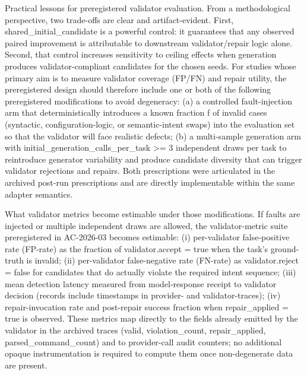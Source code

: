 \documentclass[conference]{IEEEtran}
\begin{document}
Practical lessons for preregistered validator evaluation. From a methodological perspective, two trade-offs are clear and artifact-evident. First, shared\_initial\_candidate is a powerful control: it guarantees that any observed paired improvement is attributable to downstream validator/repair logic alone. Second, that control increases sensitivity to ceiling effects when generation produces validator-compliant candidates for the chosen seeds. For studies whose primary aim is to measure validator coverage (FP/FN) and repair utility, the preregistered design should therefore include one or both of the following preregistered modifications to avoid degeneracy: (a) a controlled fault-injection arm that deterministically introduces a known fraction f of invalid cases (syntactic, configuration-logic, or semantic-intent swaps) into the evaluation set so that the validator will face realistic defects; (b) a multi-sample generation arm with initial\_generation\_calls\_per\_task >= 3 independent draws per task to reintroduce generator variability and produce candidate diversity that can trigger validator rejections and repairs. Both prescriptions were articulated in the archived post-run prescriptions and are directly implementable within the same adapter semantics.

What validator metrics become estimable under those modifications. If faults are injected or multiple independent draws are allowed, the validator-metric suite preregistered in AC-2026-03 becomes estimable: (i) per-validator false-positive rate (FP-rate) as the fraction of validator.accept = true when the task's ground-truth is invalid; (ii) per-validator false-negative rate (FN-rate) as validator.reject = false for candidates that do actually violate the required intent sequence; (iii) mean detection latency measured from model-response receipt to validator decision (records include timestamps in provider- and validator-traces); (iv) repair-invocation rate and post-repair success fraction when repair\_applied = true is observed. These metrics map directly to the fields already emitted by the validator in the archived traces (valid, violation\_count, repair\_applied, parsed\_command\_count) and to provider-call audit counters; no additional opaque instrumentation is required to compute them once non-degenerate data are present.
\end{document}
